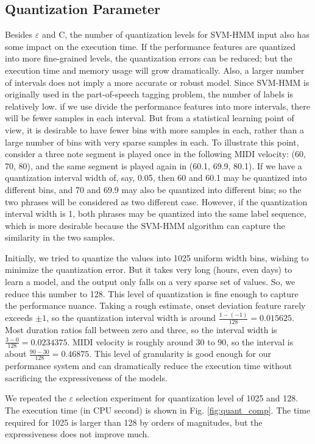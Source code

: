\subsection{Quantization Parameter}
Besides $\varepsilon$ and C, the number of quantization levels for SVM-HMM input also has some impact on the execution time. If the performance features are quantized into more fine-grained levels, the quantization errors can be reduced; but the execution time and memory usage will grow dramatically. Also, a larger number of intervals does not imply a more accurate or robust model. Since SVM-HMM is originally used in the part-of-speech tagging problem, the number of labels is relatively low. if we use divide the performance features into more intervals, there will be fewer samples in each interval. But from a statistical learning point of view, it is desirable to have fewer bins with more samples in each, rather than a large number of bins with very sparse samples in each. To illustrate this point, consider a three note segment is played once in the following MIDI velocity: (60, 70, 80), and the same segment is played again in (60.1, 69.9, 80.1). If we have a quantization interval width of, say, 0.05, then 60 and 60.1 may be quantized into different bins, and 70 and 69.9 may also be quantized into different bins; so the two phrases will be considered as two different case. However, if the quantization interval width is 1, both phrases may be quantized into the same label sequence, which is more desirable because the SVM-HMM algorithm can capture the similarity in the two samples. 

Initially, we tried to quantize the values into 1025 uniform width bins, wishing to minimize the quantization error. But it takes very long (hours, even days) to learn a model, and the output only falls on a very sparse set of values. So, we reduce this number to 128. This level of quantization is fine enough to capture the performance nuance. Taking a rough estimate, onset deviation feature rarely exceeds $\pm 1$, so the quantization interval width is around $\frac{1-(-1)}{128} = 0.015625$. Most duration ratios fall between zero and three, so the interval width is $\frac{3-0}{128} = 0.0234375$. MIDI velocity is roughly around 30 to 90, so the interval is about $\frac{90-30}{128} = 0.46875$. This level of granularity is good enough for our performance system and can dramatically reduce the execution time without sacrificing the expressiveness of the models. 

We repeated the $\varepsilon$ selection experiment for quantization level of 1025 and 128. The execution time (in CPU second) is shown in Fig. \ref{fig:quant_comp}. The time required for 1025 is larger than 128 by orders of magnitudes, but the expressiveness does not improve much.%

